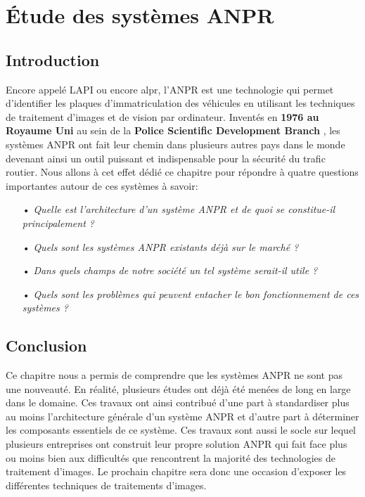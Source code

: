 \chapter{\textbf{Étude des systèmes ANPR}}
    \section{Introduction}
    Encore appelé LAPI ou encore \acrfull{alpr}, l’ANPR est une technologie qui permet d’identifier les plaques d’immatriculation des véhicules en utilisant les techniques de traitement d’images et de vision par ordinateur. Inventés en \textbf{1976 au Royaume Uni} au sein de la \textbf{Police Scientific Development Branch} \cite{wikianpr}, les systèmes ANPR ont fait leur chemin dans plusieurs autres pays dans le monde devenant ainsi un outil puissant et indispensable pour la sécurité du trafic routier. Nous allons à cet effet dédié ce chapitre pour répondre à quatre questions importantes autour de ces systèmes à savoir:
        \begin{itemize}
            \item[•] \textit{Quelle est l’architecture d’un système ANPR et de quoi se constitue-il principalement ?}
            \item[•] \textit{Quels sont les systèmes ANPR existants déjà sur le marché ?}
            \item[•] \textit{Dans quels champs de notre société un tel système serait-il utile ?}
            \item[•] \textit{Quels sont les problèmes qui peuvent entacher le bon fonctionnement de ces systèmes ?}
        \end{itemize}

    
    
    

    \section{Conclusion}
    Ce chapitre nous a permis de comprendre que les systèmes ANPR ne sont pas une nouveauté. En réalité, plusieurs études ont déjà été menées de long en large dans le domaine. Ces travaux ont ainsi contribué d’une part à standardiser plus au moins l’architecture générale d’un système ANPR et d’autre part à déterminer les composants essentiels de ce système. Ces travaux sont aussi le socle sur lequel plusieurs entreprises ont construit leur propre solution ANPR qui fait face plus ou moins bien aux difficultés que rencontrent la majorité des technologies de traitement d’images. Le prochain chapitre sera donc une occasion d'exposer les différentes techniques de traitements d'images.